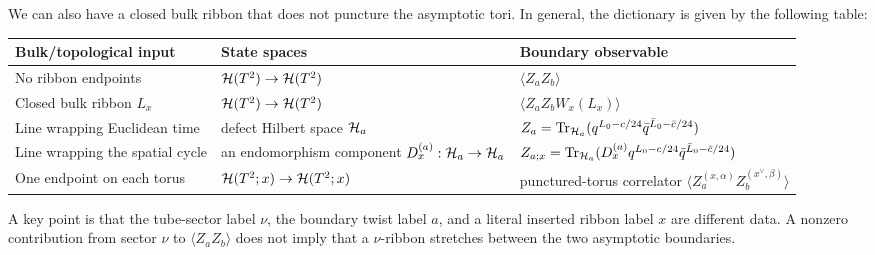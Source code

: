 \documentclass[11pt]{article}
\numberwithin{equation}{section}
\begin{document}
We can also have a closed bulk ribbon that does not puncture the asymptotic tori. In general, the dictionary is given by the following table:
\begin{center}
\renewcommand{\arraystretch}{1.35}
\begin{tabular}{p{}p{}p{}}
\toprule
Bulk/topological input & State spaces & Boundary observable \\
\midrule
No ribbon endpoints & \(\mathcal H(T^2)\to\mathcal H(T^2)\) & \(\langle Z_aZ_b\rangle\) \\
Closed bulk ribbon \(L_x\) & \(\mathcal H(T^2)\to\mathcal H(T^2)\) & \(\langle Z_aZ_bW_x(L_x)\rangle\) \\
Line wrapping Euclidean time & defect Hilbert space \(\mathcal H_a\) & \(Z_a=\operatorname{Tr}_{\mathcal H_a}(q^{L_0-c/24}\bar q^{\bar L_0-\bar c/24})\) \\
Line wrapping the spatial cycle & an endomorphism component \(D_x^{(a)}:\mathcal H_a\to\mathcal H_a\) & \(Z_{a;x}=\operatorname{Tr}_{\mathcal H_a}(D_x^{(a)}q^{L_0-c/24}\bar q^{\bar L_0-\bar c/24})\) \\
One endpoint on each torus & \(\mathcal H(T^2;x)\to\mathcal H(T^2;x)\) & punctured-torus correlator \(\langle Z_a^{(x,\alpha)}Z_b^{(x^\vee,\beta)}\rangle\) \\
\bottomrule
\end{tabular}
\end{center}

A key point is that the tube-sector label \(\nu\), the boundary twist label \(a\), and a literal inserted ribbon label \(x\) are different data. A nonzero contribution from sector \(\nu\) to \(\langle Z_aZ_b\rangle\) does not imply that a \(\nu\)-ribbon stretches between the two asymptotic boundaries.




\end{document}
